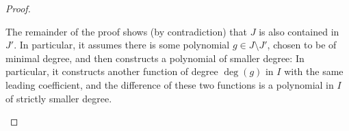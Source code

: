 \documentclass{article}
\begin{document}
\begin{proof}
\begin{enumerate}[(a)]
    The remainder of the proof shows (by contradiction) that $J$ is also
    contained in $J'$. In particular, it assumes there is some polynomial
    $g \in J \setminus J'$, chosen to be of minimal degree, and then constructs
    a polynomial of smaller degree:
    In particular, it constructs another function of degree $\deg(g)$ in $I$
    with the same leading coefficient, and the difference of these two functions
    is a polynomial in $I$ of strictly smaller degree.
  \end{enumerate}
\end{proof}
\end{document}
